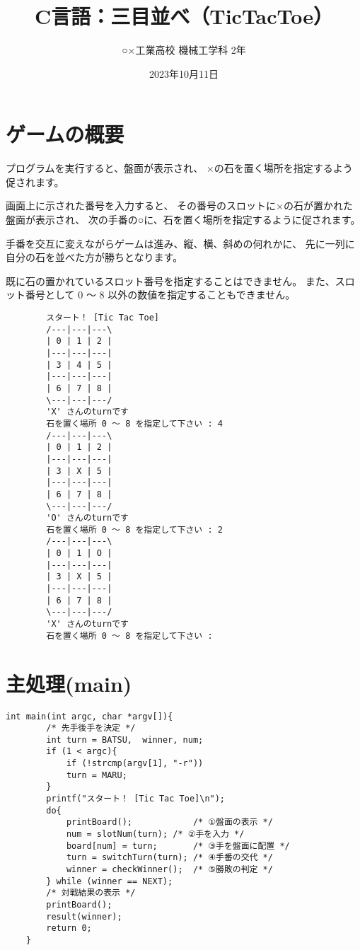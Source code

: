 \documentclass[uplatex,a4paper,11pt,oneside,openany]{jsarticle}
\begin{document}
	\title{C言語：三目並べ（TicTacToe）}
	\author{○×工業高校 機械工学科 2年}
	\date{2023年10月11日}
	\maketitle
	\pagestyle{empty}

\newpage
	
\section{ゲームの概要}

プログラムを実行すると、盤面が表示され、
×の石を置く場所を指定するよう促されます。

画面上に示された番号を入力すると、
その番号のスロットに×の石が置かれた盤面が表示され、
次の手番の○に、石を置く場所を指定するように促されます。

手番を交互に変えながらゲームは進み、縦、横、斜めの何れかに、
先に一列に自分の石を並べた方が勝ちとなります。

既に石の置かれているスロット番号を指定することはできません。
また、スロット番号として 0 〜 8 以外の数値を指定することもできません。

\begin{spacing}{0.74}
	\begin{verbatim}
		スタート！ [Tic Tac Toe]
		/---|---|---\
		| 0 | 1 | 2 |
		|---|---|---|
		| 3 | 4 | 5 |
		|---|---|---|
		| 6 | 7 | 8 |
		\---|---|---/
		'X' さんのturnです
		石を置く場所 0 〜 8 を指定して下さい : 4
		/---|---|---\
		| 0 | 1 | 2 |
		|---|---|---|
		| 3 | X | 5 |
		|---|---|---|
		| 6 | 7 | 8 |
		\---|---|---/
		'O' さんのturnです
		石を置く場所 0 〜 8 を指定して下さい : 2
		/---|---|---\
		| 0 | 1 | O |
		|---|---|---|
		| 3 | X | 5 |
		|---|---|---|
		| 6 | 7 | 8 |
		\---|---|---/
		'X' さんのturnです
		石を置く場所 0 〜 8 を指定して下さい :
	\end{verbatim}
\end{spacing}

\newpage

\section{主処理(main)}

\begin{lstlisting}[]
	int main(int argc, char *argv[]){
		/* 先手後手を決定 */
		int turn = BATSU,  winner, num;
		if (1 < argc){
			if (!strcmp(argv[1], "-r"))
			turn = MARU;
		}
		printf("スタート！ [Tic Tac Toe]\n");
		do{
			printBoard();            /* ①盤面の表示 */
			num = slotNum(turn); /* ②手を入力 */
			board[num] = turn;       /* ③手を盤面に配置 */
			turn = switchTurn(turn); /* ④手番の交代 */
			winner = checkWinner();  /* ⑤勝敗の判定 */
		} while (winner == NEXT);
		/* 対戦結果の表示 */
		printBoard();
		result(winner);
		return 0;
	}
\end{lstlisting}
\end{document}
